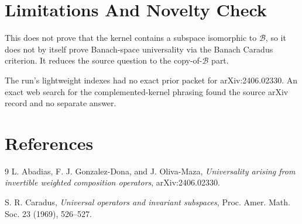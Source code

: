 \documentclass[11pt]{article}
\newcommand{\B}{\mathcal B}
\begin{document}
\section*{Limitations And Novelty Check}

This does not prove that the kernel contains a subspace isomorphic to
\(\B\), so it does not by itself prove Banach-space universality via the
Banach Caradus criterion.  It reduces the source question to the
copy-of-\(\B\) part.

The run's lightweight indexes had no exact prior packet for arXiv:2406.02330.
An exact web search for the complemented-kernel phrasing found the source
arXiv record and no separate answer.

\section*{References}

\begin{thebibliography}{9}
L. Abadias, F. J. Gonzalez-Dona, and J. Oliva-Maza,
\emph{Universality arising from invertible weighted composition operators},
arXiv:2406.02330.

S. R. Caradus,
\emph{Universal operators and invariant subspaces},
Proc. Amer. Math. Soc. 23 (1969), 526--527.
\end{thebibliography}
\end{document}
